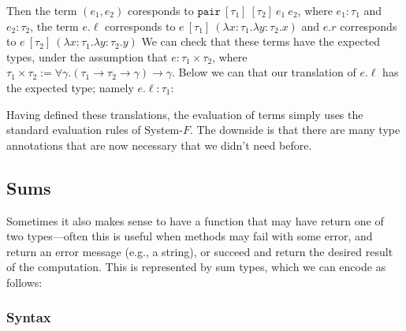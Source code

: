 \documentclass[10pt]{article}
\begin{document}
Then the term $(e_1, e_2)$ coresponds to $\texttt{pair} ~ [\tau_1] ~ [\tau_2] ~ e_1 ~ e_2$, where $e_1 : \tau_1$ and $e_2 : \tau_2$, the term $e.\ell$ corresponds to $e ~ [\tau_1] ~ (\lambda x : \tau_1 . \lambda y : \tau_2 . x)$ and $e.r$ corresponds to $e ~ [\tau_2] ~ (\lambda x : \tau_1. \lambda y : \tau_2 . y)$
We can check that these terms have the expected types, under the assumption that $e : \tau_1 \times \tau_2$, where $\tau_1 \times \tau_2 := \forall \gamma. (\tau_1 \to \tau_2 \to \gamma) \to \gamma$.
Below we can that our translation of $e.\ell$ has the expected type; namely $e.\ell : \tau_1$:
\begin{mathpar}
\end{mathpar}

Having defined these translations, the evaluation of terms simply uses the standard evaluation rules of System-$F$.
The downside is that there are many type annotations that are now necessary that we didn't need before.

\subsection{Sums}

Sometimes it also makes sense to have a function that may have return one of two types---often this is useful when methods may fail with some error, and return an error message (e.g., a string), or succeed and return the desired result of the computation.
This is represented by sum types, which we can encode as follows:

\subsubsection{Syntax}
\end{document}
